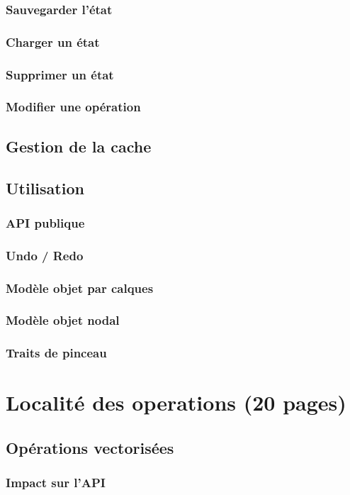 		\subsection{Sauvegarder l'état}
		\subsection{Charger un état}
		\subsection{Supprimer un état}
		\subsection{Modifier une opération}
	\section{Gestion de la cache}
	\section{Utilisation}
		\subsection{API publique}
		\subsection{Undo / Redo}
		\subsection{Modèle objet par calques}
		\subsection{Modèle objet nodal}
		\subsection{Traits de pinceau}

\chapter{Localité des operations (20 pages)}
	\section{Opérations vectorisées}
		\subsection{Impact sur l'API}
